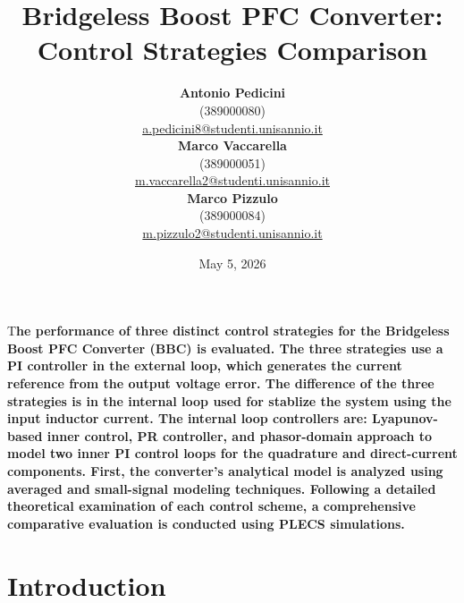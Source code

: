 \documentclass[DIV=calc, paper=a4, fontsize=11pt, twocolumn]{scrartcl}	 %
\title{Bridgeless Boost PFC Converter: Control Strategies Comparison}
\author{
    \vspace{-10pt}
    \small 
    \begin{tabular}[t]{c}
        \textbf{Antonio Pedicini} \\
        (389000080) \\
        \href{mailto:a.pedicini8@studenti.unisannio.it}{a.pedicini8@studenti.unisannio.it}
    \end{tabular}
    \hfill
    \begin{tabular}[t]{c}
        \textbf{Marco Vaccarella} \\
        (389000051) \\
        \href{mailto:m.vaccarella2@studenti.unisannio.it}{m.vaccarella2@studenti.unisannio.it}
    \end{tabular}
    \hfill
    \begin{tabular}[t]{c}
        \textbf{Marco Pizzulo} \\
        (389000084) \\
        \href{mailto:m.pizzulo2@studenti.unisannio.it}{m.pizzulo2@studenti.unisannio.it}
    \end{tabular}
}
\date{May 5, 2026}
\newcommand{\initial}[1]{ %
\lettrine[lines=3,lhang=0.3,nindent=0em]{
\color{Black}
{\textsf{#1}}}{}}
\begin{document}
\maketitle %

\thispagestyle{empty} %


\initial{T}\textbf{he performance of three distinct control strategies for the Bridgeless Boost PFC Converter (BBC) is evaluated.%
The three strategies use a PI controller in the external loop, which generates the current reference from the output voltage error. 
The difference of the three strategies is in the internal loop used for stablize the system using the input inductor current. 
The internal loop controllers are: Lyapunov-based inner control, PR controller, and phasor-domain approach to model two inner PI control loops for the quadrature and direct-current components. 
First, the converter's analytical model is analyzed using averaged and small-signal modeling techniques. Following a detailed theoretical examination of each control scheme, a comprehensive comparative evaluation is conducted using PLECS simulations.}


\section*{Introduction}
\end{document}
